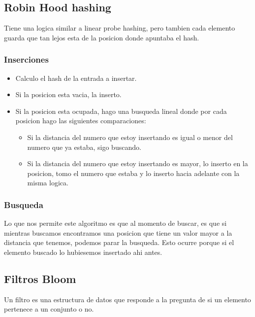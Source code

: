 
\subsection{Robin Hood hashing}
Tiene una logica similar a linear probe hashing, pero tambien cada elemento guarda que tan lejos esta de la posicion donde apuntaba el hash.

\subsubsection{Inserciones}
\begin{itemize}
  \item Calculo el hash de la entrada a insertar.
  \item Si la posicion esta vacia, la inserto.
  \item Si la posicion esta ocupada, hago una busqueda lineal donde por cada posicion hago las siguientes comparaciones:
  \begin{itemize}
    \item Si la distancia del numero que estoy insertando es igual o menor del numero que ya estaba, sigo buscando.
    \item Si la distancia del numero que estoy insertando es mayor, lo inserto en la posicion, tomo el numero que estaba y lo inserto hacia adelante con la misma logica. 
  \end{itemize}
\end{itemize}

\subsubsection{Busqueda}
Lo que nos permite este algoritmo es que al momento de buscar, es que si mientras buscamos encontramos una posicion que tiene un valor mayor a la distancia que tenemos, podemos parar la busqueda. Esto ocurre porque si el elemento buscado lo hubiesemos insertado ahi antes.

\subsection{Filtros Bloom}
Un filtro es una estructura de datos que responde a la pregunta de si un elemento pertenece a un conjunto o no. 

